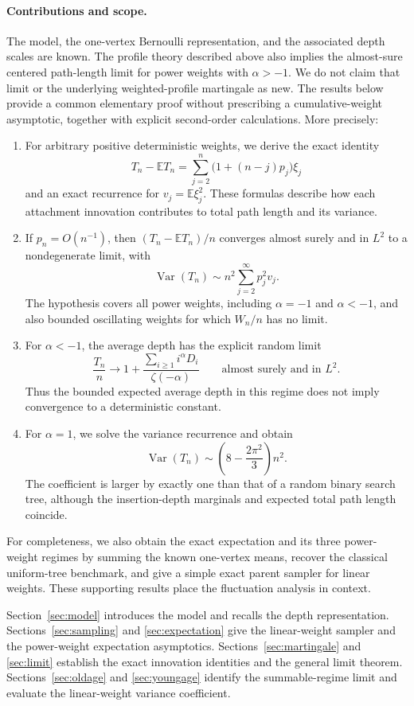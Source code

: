 \documentclass[11pt,a4paper]{article}
\newcommand{\E}{\mathbb{E}}
\newcommand{\Var}{\operatorname{Var}}
\newcommand{\1}{\mathbf{1}}
\begin{document}
\paragraph{Contributions and scope.}
The model, the one-vertex Bernoulli representation, and the associated depth scales are known.
The profile theory described above also implies the almost-sure centered path-length limit for power weights with $\alpha>-1$.
We do not claim that limit or the underlying weighted-profile martingale as new.
The results below provide a common elementary proof without prescribing a cumulative-weight asymptotic, together with explicit second-order calculations.
More precisely:
\begin{enumerate}[label=(\roman*)]
\item For arbitrary positive deterministic weights, we derive the exact identity
\[
T_n-\E T_n=\sum_{j=2}^n\bigl(1+(n-j)p_j\bigr)\xi_j
\]
and an exact recurrence for $v_j=\E\xi_j^2$.
These formulas describe how each attachment innovation contributes to total path length and its variance.
\item If $p_n=O(n^{-1})$, then $(T_n-\E T_n)/n$ converges almost surely and in $L^2$ to a nondegenerate limit, with
\[
\Var(T_n)\sim n^2\sum_{j=2}^\infty p_j^2v_j.
\]
The hypothesis covers all power weights, including $\alpha=-1$ and $\alpha<-1$, and also bounded oscillating weights for which $W_n/n$ has no limit.
\item For $\alpha<-1$, the average depth has the explicit random limit
\[
\frac{T_n}{n}\longrightarrow 1+\frac{\sum_{i\ge1}i^\alpha D_i}{\zeta(-\alpha)}
\qquad\text{almost surely and in }L^2.
\]
Thus the bounded expected average depth in this regime does not imply convergence to a deterministic constant.
\item For $\alpha=1$, we solve the variance recurrence and obtain
\[
\Var(T_n)\sim\left(8-\frac{2\pi^2}{3}\right)n^2.
\]
The coefficient is larger by exactly one than that of a random binary search tree, although the insertion-depth marginals and expected total path length coincide.
\end{enumerate}
For completeness, we also obtain the exact expectation and its three power-weight regimes by summing the known one-vertex means,
recover the classical uniform-tree benchmark, and give a simple exact parent sampler for linear weights.
These supporting results place the fluctuation analysis in context.

Section~\ref{sec:model} introduces the model and recalls the depth representation.
Sections~\ref{sec:sampling} and \ref{sec:expectation} give the linear-weight sampler and the power-weight expectation asymptotics.
Sections~\ref{sec:martingale} and \ref{sec:limit} establish the exact innovation identities and the general limit theorem.
Sections~\ref{sec:oldage} and \ref{sec:youngage} identify the summable-regime limit and evaluate the linear-weight variance coefficient.
\end{document}

